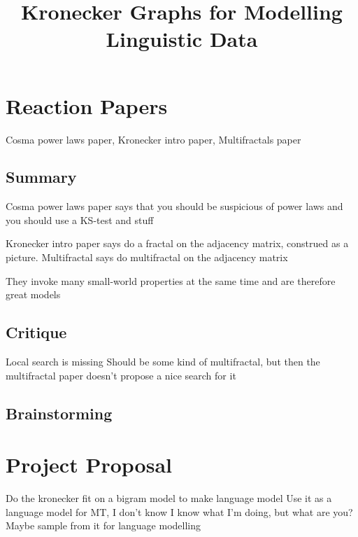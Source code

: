 \documentclass[12pt]{article}
\begin{document}
\title{Kronecker Graphs for Modelling Linguistic Data}


\section{Reaction Papers}

Cosma power laws paper, Kronecker intro paper, Multifractals paper

\subsection{Summary}
Cosma power laws paper says that you should be suspicious of power laws and you should use a KS-test and stuff

Kronecker intro paper says do a fractal on the adjacency matrix, construed as a picture. 
Multifractal says do multifractal on the adjacency matrix

They invoke many small-world properties at the same time and are therefore great models

\subsection{Critique}
Local search is missing
Should be some kind of multifractal, but then the multifractal paper doesn't propose a nice search for it
\subsection{Brainstorming}

\section{Project Proposal}
Do the kronecker fit on a bigram model to make language model
Use it as a language model for MT, I don't know
I know what I'm doing, but what are you?
Maybe sample from it for language modelling
\end{document}
